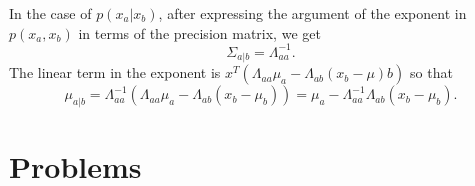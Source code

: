 In the case of $p(x_a|x_b)$, after expressing the argument of the exponent in $p(x_a, x_b)$ in
terms of the precision matrix, we get
\begin{equation}\label{c2s2e4}
\Sigma_{a|b} = \Lambda_{aa}^{-1}.
\end{equation}
The linear term in the exponent is $x^T(\Lambda_{aa}\mu_a - \Lambda_{ab}(x_b - \mu)b)$ so that
\begin{equation}\label{c2s2e5}
\mu_{a|b} = \Lambda_{aa}^{-1}(\Lambda_{aa}\mu_a - \Lambda_{ab}(x_b - \mu_b)) = \mu_a - \Lambda_{aa}^{-1}\Lambda_{ab}(x_b - \mu_b).
\end{equation}

\section{Problems}\label{c2p}
